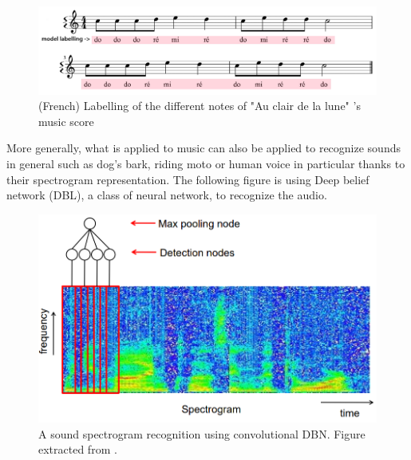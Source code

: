 \documentclass[11pt, openany]{report}
\theoremstyle{plain}
\theoremstyle{definition}
\theoremstyle{remark}
\begin{document}
\begin{figure}[h]
  \centering
  \includegraphics[scale=0.18]{figures/partition-example.jpg}
  \caption{(French) Labelling of the different notes of "Au clair de la lune" 's music score}
  \label{fig:partition-example}
\end{figure}
  
More generally, what is applied to music can also be applied to recognize sounds in general such as dog's bark, riding moto or human voice in particular thanks to their spectrogram representation. The following figure is using Deep belief network (DBL), a class of neural network, to recognize the audio.

\begin{figure}[h]
  \centering
  \includegraphics[scale=0.4]{figures/spectrogramSound.png}
  \caption{A sound spectrogram recognition using convolutional DBN. Figure extracted from \cite{sound}.}
  \label{fig:spectrogramSound}
\end{figure}
\end{document}
